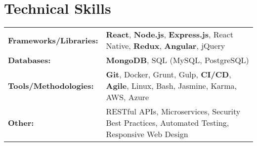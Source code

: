 \documentclass[a4paper,11pt]{article}  %
\begin{document}
\section{Technical Skills}
\begin{tabularx}{\linewidth}{@{}l X@{}}

\textbf{Frameworks/Libraries:} & \textbf{React}, \textbf{Node.js}, \textbf{Express.js}, React Native, \textbf{Redux}, \textbf{Angular}, jQuery \\
\textbf{Databases:} & \textbf{MongoDB}, SQL (MySQL, PostgreSQL) \\
\textbf{Tools/Methodologies:} & \textbf{Git}, Docker, Grunt, Gulp, \textbf{CI/CD}, \textbf{Agile}, Linux, Bash, Jasmine, Karma, AWS, Azure \\ 
\textbf{Other:} & RESTful APIs, Microservices, Security Best Practices, Automated Testing, Responsive Web Design \\ 
\end{tabularx}

\vfill
\end{document}
